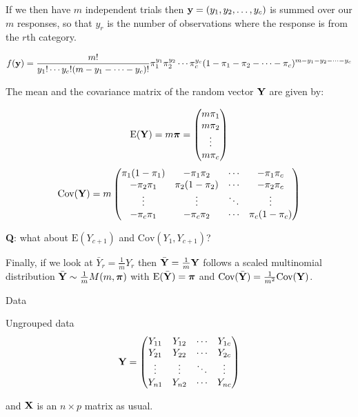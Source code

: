 \documentclass[
  ignorenonframetext,
]{beamer}
\begin{document}
\begin{frame}
If we then have \(m\) independent trials then
\({\bf y}=(y_1,y_2,\ldots,y_c)\) is summed over our \(m\) responses, so
that \(y_r\) is the number of observations where the response is from
the \(r\)th category.

\[f({\bf y})=\frac{m!}{y_1!\cdots y_c! (m-y_1-\cdots -y_c)!}\pi_1^{y_{1}} \pi_2^{y_{2}} \cdots \pi_c^{y_c}(1-\pi_1-\pi_2-\cdots-\pi_c)^{m-y_1-y_2-\cdots-y_c}\]
\end{frame}

\begin{frame}
The mean and the covariance matrix of the random vector \({\bf Y}\) are
given by:

\[\text{E}({\bf Y})=m\boldsymbol{\pi}=\begin{pmatrix}m\pi_1\\m\pi_2\\ \vdots \\ m\pi_c\end{pmatrix}\]
\[\text{Cov}({\bf Y})=m \begin{pmatrix}\pi_1(1-\pi_1)& -\pi_1\pi_2&\cdots &-\pi_1\pi_c\\
-\pi_2\pi_1& \pi_2(1-\pi_2)&\cdots &-\pi_2\pi_c\\
\vdots & \vdots & \ddots & \vdots\\
-\pi_c\pi_1& -\pi_c\pi_2&\cdots & \pi_c(1-\pi_c)\end{pmatrix}\]

\textbf{Q}: what about \(\text{E}(Y_{c+1})\) and
\(\text{Cov}(Y_1,Y_{c+1})\)?
\end{frame}

\begin{frame}
Finally, if we look at \(\bar{Y}_r=\frac{1}{m}Y_r\) then
\(\bar{\bf Y}=\frac{1}{m}{\bf Y}\) follows a scaled multinomial
distribution \(\bar{\bf Y}\sim \frac{1}{m}M(m,{\boldsymbol \pi})\) with
\(\text{E}(\bar{\bf Y})={\boldsymbol \pi}\) and
\(\text{Cov}(\bar{\bf Y})=\frac{1}{m^2}\text{Cov}({\bf Y})\).
\end{frame}

\begin{frame}{Data}
\label{data}
\begin{block}{Ungrouped data}
\label{ungrouped-data}
\[{\bf Y}=\begin{pmatrix} Y_{11}& Y_{12} & \cdots & Y_{1c}\\
Y_{21}& Y_{22} & \cdots & Y_{2c}\\
\vdots & \vdots & \ddots & \vdots\\
Y_{n1}& Y_{n2} & \cdots & Y_{nc}\\
\end{pmatrix}\]

and \({\bf X}\) is an \(n \times p\) matrix as usual.
\end{block}
\end{frame}
\end{document}
